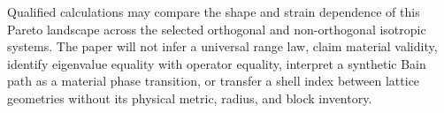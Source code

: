 \documentclass[11pt]{article}
\newenvironment{prospective}{\color{prospectivered}}{}
\begin{document}
\begin{prospective}
Qualified calculations may compare the shape and strain dependence of this Pareto
landscape across the selected orthogonal and non-orthogonal isotropic systems. The paper
will not infer a universal range law, claim material validity, identify eigenvalue
equality with operator equality, interpret a synthetic Bain path as a material phase
transition, or transfer a shell index between lattice geometries without its physical
metric, radius, and block inventory.
\end{prospective}

\clearpage
\appendix




\end{document}
